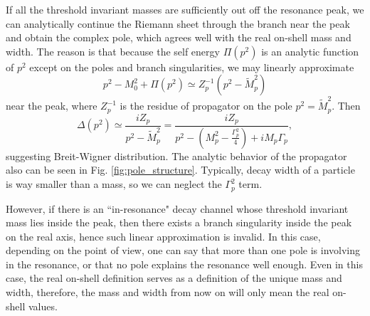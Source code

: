 \documentclass[11pt]{article}
\theoremstyle{definition}
\theoremstyle{remark}
\begin{document}
	If all the threshold invariant masses are sufficiently out off the resonance peak, we can analytically continue the Riemann sheet through the branch near the peak and obtain the complex pole, which agrees well with the real on-shell mass and width.
	The reason is that because the self energy $\Pi(p^{2})$ is an analytic function of $p^{2}$ except on the poles and branch singularities, we may linearly approximate
	\[p^{2}-M_{0}^{2}+\Pi(p^{2})\simeq Z_{p}^{-1}(p^{2}-\tilde{M}_{p}^{2})\]
	near the peak, where $Z_{p}^{-1}$ is the residue of propagator on the pole $p^{2}=\tilde{M}_{p}^{2}$.
	Then
	\[\Delta(p^{2})\simeq\frac{iZ_{p}}{p^{2}-\tilde{M}_{p}^{2}}=\frac{iZ_{p}}{p^{2}-(M_{p}^{2}-\frac{\Gamma_{p}^{2}}{4})+iM_{p}\Gamma_{p}},\]
	suggesting Breit-Wigner distribution.
	The analytic behavior of the propagator also can be seen in Fig. \ref{fig:pole_structure}.
	Typically, decay width of a particle is way smaller than a mass, so we can neglect the $\Gamma_{p}^{2}$ term.
	
	However, if there is an ``in-resonance" decay channel whose threshold invariant mass lies inside the peak, then there exists a branch singularity inside the peak on the real axis, hence such linear approximation is invalid.
	In this case, depending on the point of view, one can say that more than one pole is involving in the resonance, or that no pole explains the resonance well enough.
	Even in this case, the real on-shell definition serves as a definition of the unique mass and width, therefore, the mass and width from now on will only mean the real on-shell values.
	
\end{document}

